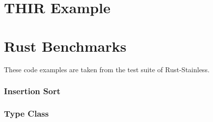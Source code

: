 \section{THIR Example}


\clearpage
\section{Rust Benchmarks}

These code examples are taken from the test suite of Rust-Stainless.

\subsubsection{Insertion Sort}


\subsubsection{Type Class}

